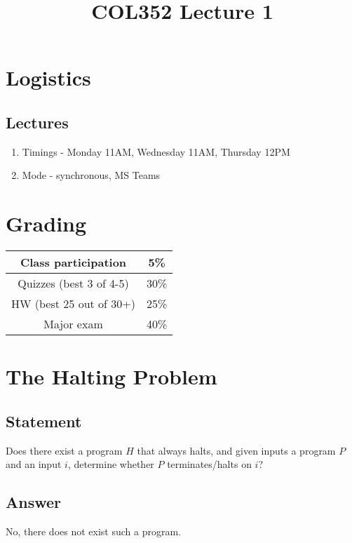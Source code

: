 \documentclass[a4paper]{article}
\title{\textbf{COL352 Lecture 1}}
\date{}
\begin{document}
\maketitle
\tableofcontents

\iffalse

\section{Logistics}
\subsection{Lectures}
\begin{enumerate}
    \item Timings - Monday 11AM, Wednesday 11AM, Thursday 12PM
    \item Mode - synchronous, MS Teams
\end{enumerate}
\section{Grading}
\begin{center}
\begin{tabular}{|c|c|}
    \hline
    Class participation     &  5\% \\
    \hline
    Quizzes (best 3 of 4-5) & 30\% \\
    \hline
    HW (best 25 out of 30+) & 25\% \\
    \hline
    Major exam	            & 40\% \\
    \hline
\end{tabular}
\end{center}
\section{The Halting Problem}
\subsection{Statement}
Does there exist a program $H$ that always halts, and given inputs a program $P$ and an input $i$, determine whether $P$ terminates/halts on $i$?
\subsection{Answer}
No, there does not exist such a program.
\end{document}
